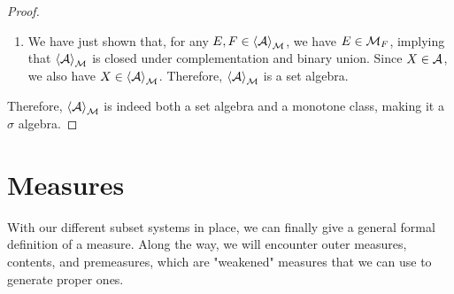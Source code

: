 \begin{proof}
\begin{enumerate}
		\begin{align*}
			\angles{\cA}_\cM \subset \angles{\cM_F}_\cM = \cM_F.
		\end{align*}
		\item We have just shown that, for any $E,F \in \left\langle \mathcal{A} \right\rangle_{\mathcal{M}}$, we have $E \in \mathcal{M}_F$, implying that $\left\langle \mathcal{A} \right\rangle_{\mathcal{M}}$ is closed under complementation and binary union. Since $X \in \mathcal{A}$, we also have $X \in \left\langle \mathcal{A} \right\rangle_{\mathcal{M}}$. Therefore, $\left\langle \mathcal{A} \right\rangle_{\mathcal{M}}$ is a set algebra.
	\end{enumerate}
	Therefore, $\left\langle \mathcal{A} \right\rangle_{\mathcal{M}}$ is indeed both a set algebra and a monotone class, making it a $\sigma$ algebra. 
\end{proof}
\clearpage

\section{Measures}
With our different subset systems in place, we can finally give a general formal definition of a measure. Along the way, we will encounter outer measures, contents, and premeasures, which are "weakened" measures that we can use to generate proper ones.

